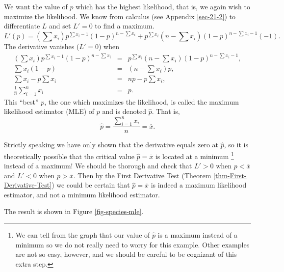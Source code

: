 \documentclass[captions=tableheading]{scrbook}
\begin{document}
\begin{example}
We want the value of \(p\) which has the highest likelihood, that is, we again wish to maximize the likelihood. We know from calculus (see Appendix \ref{sec-21-2}) to differentiate \(L\) and set \(L'=0\) to find a maximum.
\[
L'(p)=\left(\sum x_{i}\right)p^{\sum x_{i}-1}(1-p)^{n-\sum x_{i}}+p^{\sum x_{i}}\left(n-\sum x_{i}\right)(1-p)^{n-\sum x_{i}-1}(-1).
\]
The derivative vanishes (\(L'=0\)) when
\begin{eqnarray*}
\left(\sum x_{i}\right)p^{\sum x_{i}-1}(1-p)^{n-\sum x_{i}} & = & p^{\sum x_{i}}\left(n-\sum x_{i}\right)(1-p)^{n-\sum x_{i}-1},\\
\sum x_{i}(1-p) & = & \left(n-\sum x_{i}\right)p,\\
\sum x_{i}-p\sum x_{i} & = & np-p\sum x_{i},\\
\frac{1}{n}\sum_{i=1}^{n}x_{i} & = & p.
\end{eqnarray*}
This ``best'' \(p\), the one which maximizes the likelihood, is called the maximum likelihood estimator (MLE) of \(p\) and is denoted \(\hat{p}\). That is, 
\begin{equation} 
\hat{p}=\frac{\sum_{i=1}^{n}x_{i}}{n}=\overline{x}.
\end{equation}

\begin{rem}
Strictly speaking we have only shown that the derivative equals zero at \(\hat{p}\), so it is theoretically possible that the critical value \(\hat{p}=\overline{x}\) is located at a minimum
\footnote{We can tell from the graph that our value of \(\hat{p}\) is a maximum instead of a minimum so we do not really need to worry for this example. Other examples are not so easy, however, and we should be careful to be cognizant of this extra step.}
instead of a maximum! We should be thorough and check that \(L'>0\) when \(p<\overline{x}\) and \(L'<0\) when \(p>\overline{x}\). Then by the First Derivative Test (Theorem \ref{thm-First-Derivative-Test}) we could be certain that \(\hat{p}=\overline{x}\) is indeed a maximum likelihood estimator, and not a minimum likelihood estimator.
\end{rem}

The result is shown in Figure \ref{fig-species-mle}.
\end{example}
\end{document}
